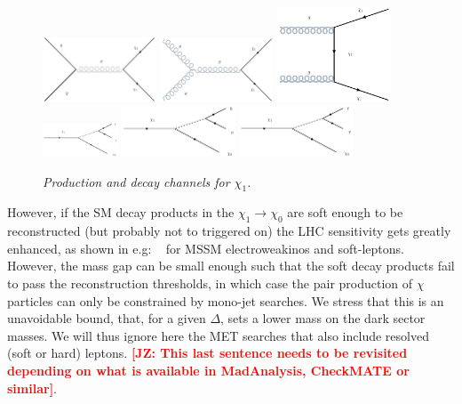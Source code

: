 \documentclass[11pt]{cernrep}
\def\JZ#1{{\bf  \textcolor{red}{[JZ: {#1}]}}}
\begin{document}
 \begin{figure}[!htp]
	\centering
	\includegraphics[width=0.3\textwidth]{./figures/chi1ProductionA.png}
		\includegraphics[width=0.3\textwidth]{./figures/chi1ProductionB.png}  
	\includegraphics[width=0.3\textwidth]{./figures/chi1ProductionC.pdf}\\ 
	\includegraphics[width=0.2\textwidth]{./figures/chi1DecA.png}
\includegraphics[width=0.3\textwidth]{./figures/chi1DecB.png}  
\includegraphics[width=0.3\textwidth]{./figures/chi1DecC.png}	
	\caption{\it Production and decay channels for $\chi_1$.}
\end{figure}


However, if the SM decay products in the $\chi_1 \to \chi_0$ are soft enough to be reconstructed (but probably not to triggered on) the LHC sensitivity gets greatly enhanced, as shown in e.g: ~\cite{Schwaller:2013baa} for MSSM electroweakinos and soft-leptons. However, the mass gap can be small enough such that the soft decay products fail to pass the reconstruction thresholds, in which case the pair production of $\chi$ particles can only be constrained by  mono-jet searches. We stress that this is an unavoidable bound, that, for a given $\Delta$, sets a lower mass on the dark sector masses. We will thus ignore here the MET searches that also include resolved (soft or hard) leptons. \JZ{This last sentence needs to be revisited depending on what is available in MadAnalysis, CheckMATE or similar}.
\end{document}
